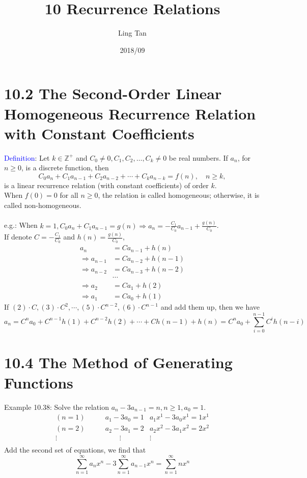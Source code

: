 \documentclass[a4paper]{article}
\title{10 Recurrence Relations}
\author{Ling Tan}
\date{2018/09}
\begin{document}
\maketitle

\section*{10.2 The Second-Order Linear Homogeneous Recurrence Relation with Constant Coefficients}
\textcolor{blue}{Definition}: Let $k\in\mathbb{Z}^+$ and $C_0\neq0,C_1,C_2, \ldots, C_k\neq 0$ be real numbers. If $a_n$, for $n\geq0$, is a discrete function, then
$$C_0a_n+C_1a_{n-1}+C_2a_{n-2}+\cdots+C_ka_{n-k}=f(n),\quad n\geq k,$$
is a linear recurrence relation (with constant coefficients) of order $k$.\\
When $f(0)=0$ for all $n\geq0$, the relation is called homogeneous; otherwise, it is called non-homogeneous.\\
\\
\color{red}e.g.: \color{black} When $k=1, C_0a_n+C_1a_{n-1}=g(n)\Rightarrow a_n=-\frac{C_1}{C_0}a_{n-1}+\frac{g(n)}{C_0}$.\\
If denote $C=-\frac{C_1}{C_0}$ and $h(n)=\frac{g(n)}{C_0}$,\\
\begin{align}
    a_n&=Ca_{n-1}+h(n)\\
    \Rightarrow a_{n-1}&=Ca_{n-2}+h(n-1)\\
    \Rightarrow a_{n-2}&=Ca_{n-3}+h(n-2)\\
    &\cdots\\
    \Rightarrow a_{2}&=Ca_{1}+h(2)\\
    \Rightarrow a_{1}&=Ca_{0}+h(1)
\end{align}
If $(2)\cdot C, (3)\cdot C^2,\cdots, (5)\cdot C^{n-2}, (6)\cdot C^{n-1}$ and add them up, then we have
$$a_n=C^na_0+C^{n-1}h(1)+C^{n-2}h(2)+\cdots + Ch(n-1)+h(n)=C^na_0+\sum_{i=0}^{n-1}{C^ih(n-i)}$$

\section*{10.4 The Method of Generating Functions}
Example 10.38: Solve the relation $a_n-3a_{n-1}=n,n\geq 1, a_0=1$.
\begin{align*}
    (n=1)&\quad\quad a_1-3a_0=1 & a_1x^1-3a_0x^1=1x^1\\
    (n=2)&\quad\quad a_2-3a_1=2 & a_2x^2-3a_1x^2=2x^2\\
    \vdots\quad&\quad\quad\quad\quad \vdots &\vdots\quad\quad\quad\quad\\
\end{align*}
Add the second set of equations, we find that
\begin{equation} \label{eq:1}
\sum_{n=1}^{\infty}{a_nx^n}-3\sum_{n=1}^{\infty}{a_{n-1}x^n}=\sum_{n=1}^{\infty}{nx^n}
\end{equation}
\end{document}
